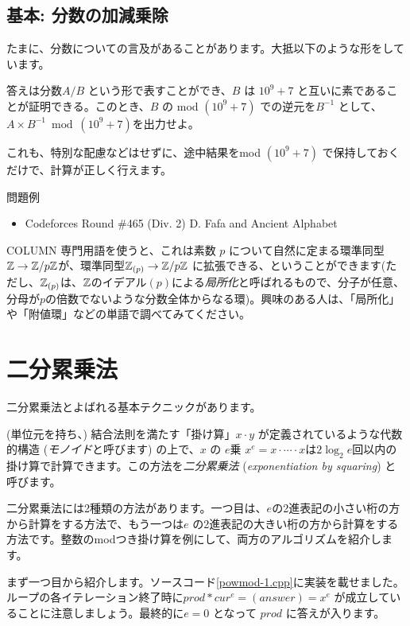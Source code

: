 \documentclass{jsarticle}
\begin{document}
  \subsection{基本: 分数の加減乗除}
  \label{subsec:operations-on-fractions}
  たまに、分数についての言及があることがあります。大抵以下のような形をしています。
  \begin{center}
   答えは分数$A/B$ という形で表すことができ、$B$ は $10^9 + 7$ と互いに素であることが証明できる。このとき、$B$ の mod $(10^9+7)$ での逆元を$B^{-1}$ として、$A \times B^{-1} \bmod (10^9 + 7)$を出力せよ。
  \end{center}
  これも、特別な配慮などはせずに、途中結果をmod $(10^9+7)$ で保持しておくだけで、計算が正しく行えます。
  \begin{itembox}[l]{問題例}
   \begin{itemize}
    \item Codeforces Round \#465 (Div. 2) D. Fafa and Ancient Alphabet
   \end{itemize}
  \end{itembox}
  \begin{itembox}[l]{COLUMN}
   専門用語を使うと、これは素数 $p$ について自然に定まる環準同型$\mathbb{Z} \to \mathbb{Z}/p\mathbb{Z}$が、環準同型$\mathbb{Z}_{(p)} \to \mathbb{Z}/p\mathbb{Z}$ に拡張できる、ということができます(ただし、$\mathbb{Z}_{(p)}$は、$\mathbb{Z}$のイデアル$(p)$による\emph{局所化}と呼ばれるもので、分子が任意、分母が$p$の倍数でないような分数全体からなる環)。興味のある人は、「局所化」や「附値環」などの単語で調べてみてください。
  \end{itembox}
 \section{二分累乗法}
 \label{sec:exponentiation-by-squaring}
 二分累乗法とよばれる基本テクニックがあります。

 (単位元を持ち、) 結合法則を満たす「掛け算」$x \cdot y$ が定義されているような代数的構造 (\emph{モノイド}と呼びます) の上で、$x$ の $e$乗 $x^e = x \cdot \cdots \cdot x$は$2\log_2 e$回以内の掛け算で計算できます。この方法を\emph{二分累乗法} (\emph{exponentiation by squaring}) と呼びます。

 二分累乗法には2種類の方法があります。一つ目は、$e$の2進表記の小さい桁の方から計算をする方法で、もう一つは$e$ の2進表記の大きい桁の方から計算をする方法です。整数のmodつき掛け算を例にして、両方のアルゴリズムを紹介します。

 まず一つ目から紹介します。ソースコード\ref{powmod-1.cpp}に実装を載せました。
 ループの各イテレーション終了時に$prod * cur^e = (answer) = x^e$ が成立していることに注意しましょう。最終的に$e = 0$ となって $prod$ に答えが入ります。
 
\end{document}
